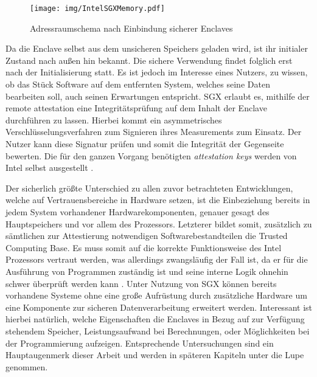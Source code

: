 \begin{figure}
	\texttt{[image: img/IntelSGXMemory.pdf]}
	\centering
	\caption{Adressraumschema nach Einbindung sicherer Enclaves}
	\label{fig:intelsgxmemory}
\end{figure}

Da die Enclave selbst aus dem unsicheren Speichers geladen wird, ist ihr initialer Zustand nach außen hin bekannt. Die sichere Verwendung findet folglich erst nach der Initialisierung statt. Es ist jedoch im Interesse eines Nutzers, zu wissen, ob das Stück Software auf dem entfernten System, welches seine Daten bearbeiten soll, auch seinen Erwartungen entspricht. SGX erlaubt es, mithilfe der remote attestation eine Integritätsprüfung auf dem Inhalt der Enclave durchführen zu lassen. Hierbei kommt ein asymmetrisches Verschlüsselungsverfahren zum Signieren ihres Measurements zum Einsatz. Der Nutzer kann diese Signatur prüfen und somit die Integrität der Gegenseite bewerten. Die für den ganzen Vorgang benötigten \textit{attestation keys} werden von Intel selbst ausgestellt \cite{Johnson2016}.

Der sicherlich größte Unterschied zu allen zuvor betrachteten Entwicklungen, welche auf Vertrauensbereiche in Hardware setzen, ist die Einbeziehung bereits in jedem System vorhandener Hardwarekomponenten, genauer gesagt des Hauptspeichers und vor allem des Prozessors. Letzterer bildet somit, zusätzlich zu sämtlichen zur Attestierung notwendigen Softwarebestandteilen die Trusted Computing Base. Es muss somit auf die korrekte Funktionsweise des Intel Prozessors vertraut werden, was allerdings zwangsläufig der Fall ist, da er für die Ausführung von Programmen zuständig ist und seine interne Logik ohnehin schwer überprüft werden kann \cite{Aumasson2016}. Unter Nutzung von SGX können bereits vorhandene Systeme ohne eine große Aufrüstung durch zusätzliche Hardware um eine Komponente zur sicheren Datenverarbeitung erweitert werden. Interessant ist hierbei natürlich, welche Eigenschaften die Enclaves in Bezug auf zur Verfügung stehendem Speicher, Leistungsaufwand bei Berechnungen, oder Möglichkeiten bei der Programmierung aufzeigen. Entsprechende Untersuchungen sind ein Hauptaugenmerk dieser Arbeit und werden in späteren Kapiteln unter die Lupe genommen.
